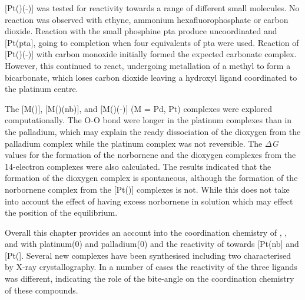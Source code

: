 [Pt(\tButhixantphos)(-)] was tested for reactivity towards a range of different small molecules.  No reaction was observed with ethyne, ammonium hexafluorophosphate or carbon dioxide.  Reaction with the small phosphine \gls{pta} produce uncoordinated \tButhixantphos{} and [Pt(pta], going to completion when four equivalents of pta were used.  Reaction of [Pt(\tButhixantphos)(-)] with carbon monoxide initially formed the expected carbonate complex.  However, this continued to react, undergoing metallation of a \tBu{} methyl to form a bicarbonate, which loses carbon dioxide leaving a hydroxyl ligand coordinated to the platinum centre.  

The [M(\tBuxantphos)], [M(\tBuxantphos)(nb)], and [M(\tBuxantphos)(-)] (M = Pd, Pt) complexes were explored computationally.  The O-O bond were longer in the platinum complexes than in the palladium, which may explain the ready dissociation of the dioxygen from the palladium complex while the platinum complex was not reversible.  The $\Delta$\emph{G} values for the formation of the norbornene and the dioxygen complexes from the 14-electron complexes were also calculated.  The results indicated that the formation of the dioxygen complex is spontaneous, although the formation of the norbornene complex from the [Pt(\tBuxantphos)] complexes is not.  While this does not take into account the effect of having excess norbornene in solution which may effect the position of the equilibrium.  

Overall this chapter provides an account into the coordination chemistry of \tBusixantphos, \tButhixantphos, and \tBuxantphos{} with platinum(0) and palladium(0) and the reactivity of \Phthixantphos{} towards [Pt(nb] and [Pt(].  Several new complexes have been synthesised including two characterised by X-ray crystallography.  In a number of cases the reactivity of the three \tBuxantphos{} ligands was different, indicating the role of the bite-angle on the coordination chemistry of these compounds.  









